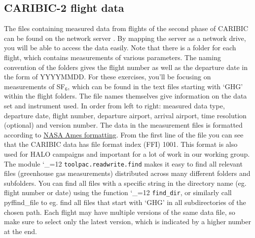 \documentclass{article}
\makeatletter
\newcommand{\pyf}{%
  \begingroup\catcode`_=12
  \pyf@
}
\newcommand{\pyf@}[1]{\texttt{#1}\endgroup}
\theoremstyle{definition}
\newtheorem{exmp}{Example}[section]
\makeatother
\begin{document}
\subsection{CARIBIC-2 flight data}
The files containing measured data from flights of the second phase of CARIBIC can be found on the network server . By mapping the server as a network drive, you will be able to access the data easily. Note that there is a folder for each flight, which contains measurements of various parameters. The naming convention of the folders gives the flight number as well as the departure date in the form of YYYYMMDD. For these exercises, you'll be focusing on measurements of SF$_6$, which can be found in the text files starting with `GHG' within the flight folders. The file names themselves give information on the data set and instrument used. In order from left to right: measured data type,  departure date, flight number, departure airport, arrival airport, time resolution (optional) and version number. The data in the measurement files is formatted according to \href{https://espo.nasa.gov/content/Ames_Format_Specification_v20}{NASA Ames formatting}. From the first line of the file you can see that the CARIBIC data has file format index (FFI) 1001. This format is also used for HALO campaigns and important for a lot of work in our working group. \\

The module \pyf{toolpac.readwrite.find} makes it easy to find all relevant files (greenhouse gas measurements) distributed across many different folders and subfolders. You can find all files with a specific string in the directory name (eg. flight number or date) using the function \pyf{find\_dir}, or similarly call pyf{find\_file} to eg. find all files that start with `GHG' in all subdirectories of the chosen path. Each flight may have multiple versions of the same data file, so make sure to select only the latest version, which is indicated by a higher number at the end. 

\end{document}
